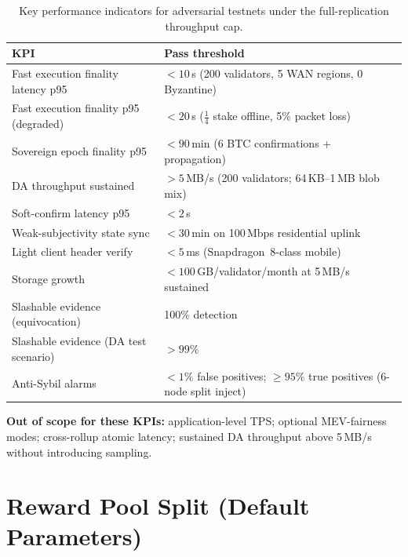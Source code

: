 \documentclass[11pt,a4paper,twoside]{report}
\theoremstyle{definition}
\begin{document}
\begin{table}[htbp]
  \centering
  \caption{Key performance indicators for adversarial testnets under the full-replication throughput cap.}
  \small
  \begin{tabular}{@{}p{7.8cm}p{6.8cm}@{}}
    \toprule
    \textbf{KPI} & \textbf{Pass threshold} \\
    \midrule
    Fast execution finality latency p95 & $< 10$\,s (200 validators, 5 WAN regions, 0 Byzantine) \\
    Fast execution finality p95 (degraded) & $< 20$\,s ($\frac{1}{4}$ stake offline, 5\% packet loss) \\
    Sovereign epoch finality p95 & $< 90$\,min (6 BTC confirmations + propagation) \\
    DA throughput sustained & $> 5$\,MB/s (200 validators; 64\,KB--1\,MB blob mix) \\
    Soft-confirm latency p95 & $< 2$\,s \\
    Weak-subjectivity state sync & $< 30$\,min on 100\,Mbps residential uplink \\
    Light client header verify & $< 5$\,ms (Snapdragon~8-class mobile) \\
    Storage growth & $< 100$\,GB/validator/month at 5\,MB/s sustained \\
    Slashable evidence (equivocation) & 100\% detection \\
    Slashable evidence (DA test scenario) & $> 99\%$ \\
    Anti-Sybil alarms & $< 1\%$ false positives; $\geq 95\%$ true positives (6-node split inject) \\
    \bottomrule
  \end{tabular}
\end{table}

\noindent\textbf{Out of scope for these KPIs:} application-level TPS; optional MEV-fairness modes; cross-rollup atomic latency; sustained DA throughput above 5\,MB/s without introducing sampling.

\chapter{Reward Pool Split (Default Parameters)}
\label{app:rewards}
\end{document}
